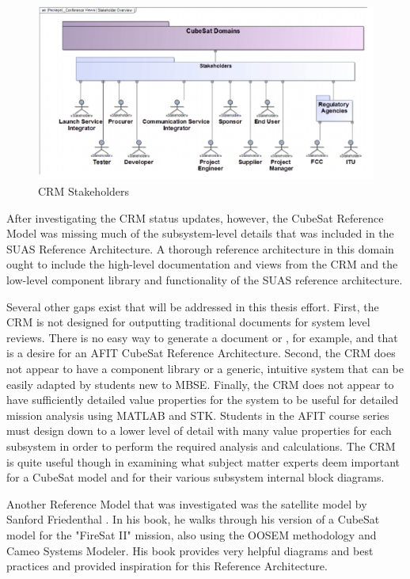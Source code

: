 \begin{figure}[H]
    \centering
    \includegraphics[width=\textwidth]{Thesis/Literature_Review/Lit Review Figures/CubeSat Stakeholders.png}
    \caption{CRM Stakeholders}
    \label{fig:CRM Stakeholders}
\end{figure}

After investigating the CRM status updates, however, the CubeSat Reference Model was missing much of the subsystem-level details that was included in the SUAS Reference Architecture. A thorough reference architecture in this domain ought to include the high-level documentation and views from the CRM and the low-level component library and functionality of the SUAS reference architecture. 

Several other gaps exist that will be addressed in this thesis effort. First, the CRM is not designed for outputting traditional documents for system level reviews. There is no easy way to generate a  document or , for example, and that is a desire for an AFIT CubeSat Reference Architecture. Second, the CRM does not appear to have a component library or a generic, intuitive system that can be easily adapted by students new to MBSE. Finally, the CRM does not appear to have sufficiently detailed value properties for the system to be useful for detailed mission analysis using MATLAB and STK. Students in the AFIT course series must design down to a lower level of detail with many value properties for each subsystem in order to perform the required analysis and calculations. The CRM is quite useful though in examining what subject matter experts deem important for a CubeSat model and for their various subsystem internal block diagrams. 

Another Reference Model that was investigated was the satellite model by Sanford Friedenthal \citep{FriedenthalArchitectingSpacecraft}. In his book, he walks through his version of a CubeSat model for the "FireSat II" mission, also using the OOSEM methodology and Cameo Systems Modeler. His book provides very helpful diagrams and best practices and provided inspiration for this Reference Architecture. 